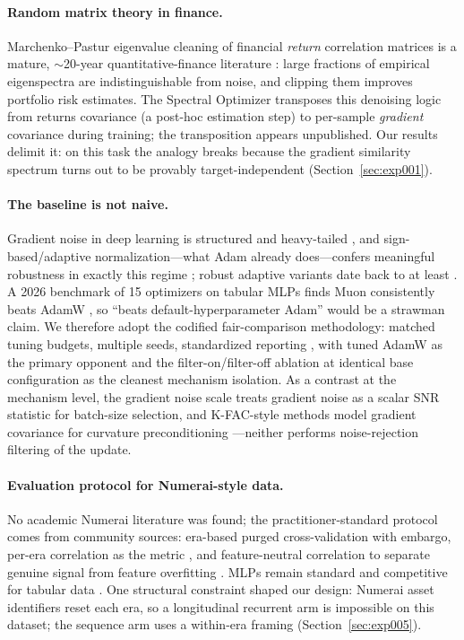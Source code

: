 \paragraph{Random matrix theory in finance.}
Marchenko--Pastur eigenvalue cleaning of financial \emph{return} correlation
matrices is a mature, $\sim$20-year quantitative-finance literature
\citep{pafka2004rmtexponentialweighting, potters2005rmtoldlaces,
bouchaud2009rmtfinancereview, lakshtanov2023denoisingcorrelation}: large
fractions of empirical eigenspectra are indistinguishable from noise, and
clipping them improves portfolio risk estimates. The Spectral Optimizer
transposes this denoising logic from returns covariance (a post-hoc
estimation step) to per-sample \emph{gradient} covariance during training;
the transposition appears unpublished. Our results delimit it: on this task
the analogy breaks because the gradient similarity spectrum turns out to be
provably target-independent (Section~\ref{sec:exp001}).

\paragraph{The baseline is not naive.}
Gradient noise in deep learning is structured and heavy-tailed
\citep{xie2022overlookedstructure, dang2025heavytailedstability}, and
sign-based/adaptive normalization---what Adam already does---confers
meaningful robustness in exactly this regime \citep{yu2026signheavytailed};
robust adaptive variants date back to at least \citet{gulcehre2017robustadaptive}.
A 2026 benchmark of 15 optimizers on tabular MLPs finds Muon consistently
beats AdamW \citep{gorishniy2026benchmarkingoptimizers}, so ``beats
default-hyperparameter Adam'' would be a strawman claim. We therefore adopt
the codified fair-comparison methodology: matched tuning budgets, multiple
seeds, standardized reporting \citep{schneider2019deepobs,
blauth2024fastoptimizerbenchmark}, with tuned AdamW as the primary opponent
and the filter-on/filter-off ablation at identical base configuration as the
cleanest mechanism isolation. As a contrast at the mechanism level, the
gradient noise scale \citep{mccandlish2018gradientnoisescale} treats
gradient noise as a scalar SNR statistic for batch-size selection, and
K-FAC-style methods model gradient covariance for curvature preconditioning
\citep{martens2018kfacrnn}---neither performs noise-rejection filtering of
the update.

\paragraph{Evaluation protocol for Numerai-style data.}
No academic Numerai literature was found; the practitioner-standard protocol
comes from community sources: era-based purged cross-validation with
embargo, per-era correlation as the metric \citep{numerai_forum2021_eras},
and feature-neutral correlation to separate genuine signal from feature
overfitting \citep{numerai_forum2021_fnc}. MLPs remain standard and
competitive for tabular data \citep{gorishniy2021revisitingtabular}. One
structural constraint shaped our design: Numerai asset identifiers reset
each era, so a longitudinal recurrent arm is impossible on this dataset; the
sequence arm uses a within-era framing (Section~\ref{sec:exp005}).
